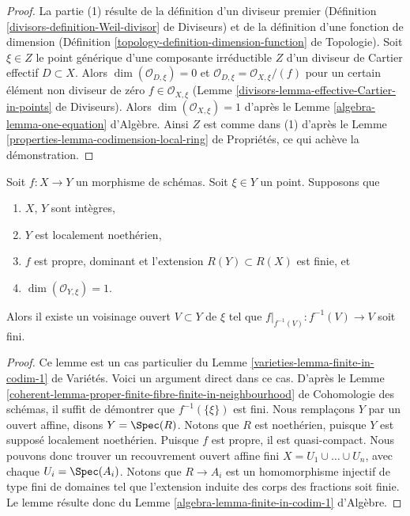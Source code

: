 \begin{proof}
La partie (1) résulte de la définition d'un diviseur premier
(Définition \ref{divisors-definition-Weil-divisor} de Diviseurs)
et de la définition d'une fonction de dimension
(Définition \ref{topology-definition-dimension-function} de Topologie).
Soit $\xi \in Z$ le point générique d'une composante irréductible $Z$ d'un
diviseur de Cartier effectif $D \subset X$.
Alors $\dim(\mathcal{O}_{D, \xi}) = 0$ et
$\mathcal{O}_{D, \xi} = \mathcal{O}_{X, \xi}/(f)$ pour un certain
élément non diviseur de zéro $f \in \mathcal{O}_{X, \xi}$ (Lemme
\ref{divisors-lemma-effective-Cartier-in-points} de Diviseurs).
Alors $\dim(\mathcal{O}_{X, \xi}) = 1$ d'après le
Lemme \ref{algebra-lemma-one-equation} d'Algèbre. Ainsi $Z$ est comme dans (1) d'après le
Lemme \ref{properties-lemma-codimension-local-ring} de Propriétés,
ce qui achève la démonstration.
\end{proof}

\begin{lemma}
\label{lemma-finite-in-codimension-one}
Soit $f : X \to Y$ un morphisme de schémas.
Soit $\xi \in Y$ un point.
Supposons que
\begin{enumerate}
\item $X$, $Y$ sont intègres,
\item $Y$ est localement noethérien,
\item $f$ est propre, dominant et l'extension $R(Y) \subset R(X)$ est finie, et
\item $\dim(\mathcal{O}_{Y, \xi}) = 1$.
\end{enumerate}
Alors il existe un voisinage ouvert $V \subset Y$ de $\xi$
tel que $f|_{f^{-1}(V)} : f^{-1}(V) \to V$ soit fini.
\end{lemma}

\begin{proof}
Ce lemme est un cas particulier du
Lemme \ref{varieties-lemma-finite-in-codim-1} de Variétés.
Voici un argument direct dans ce cas.
D'après le Lemme
\ref{coherent-lemma-proper-finite-fibre-finite-in-neighbourhood} de Cohomologie des schémas,
il suffit de démontrer que $f^{-1}(\{\xi\})$ est fini.
Nous remplaçons $Y$ par un ouvert affine, disons $Y = \Spec(R)$.
Notons que $R$ est noethérien, puisque $Y$ est supposé localement noethérien.
Puisque $f$ est propre, il est quasi-compact. Nous pouvons donc trouver un recouvrement
ouvert affine fini $X = U_1 \cup \ldots \cup U_n$, avec
chaque $U_i = \Spec(A_i)$. Notons que $R \to A_i$ est un
homomorphisme injectif de type fini de domaines tel que
l'extension induite des corps des fractions soit finie.
Le lemme résulte donc
du Lemme \ref{algebra-lemma-finite-in-codim-1} d'Algèbre.
\end{proof}


